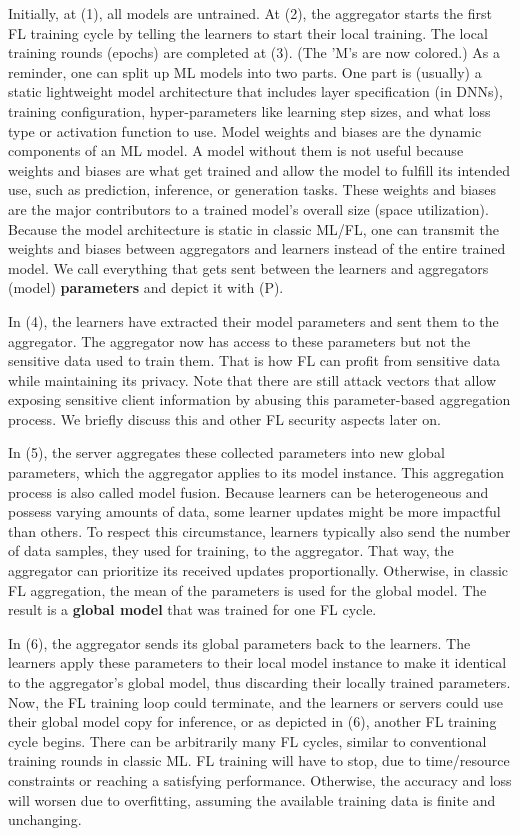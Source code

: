 Initially, at (1), all models are untrained.
At (2), the aggregator starts the first FL training cycle by telling the learners
to start their local training.
The local training rounds (epochs) are completed at (3).
(The 'M's are now colored.)
As a reminder, one can split up ML models into two parts.
One part is (usually) a static lightweight model architecture
that includes layer specification (in DNNs), training configuration,
hyper-parameters like learning step sizes, and what loss type or
activation function to use.
Model weights and biases are the dynamic components of an ML model.
A model without them is not useful because weights and biases
are what get trained and allow the model to fulfill its intended use,
such as prediction, inference, or generation tasks.
These weights and biases are the major contributors to
a trained model's overall size (space utilization).
Because the model architecture is static in classic ML/FL,
one can transmit the weights and biases between aggregators and learners
instead of the entire trained model.
We call everything that gets sent between the learners and aggregators
(model) \textbf{parameters} and depict it with (P).

In (4), the learners have extracted their model parameters and sent them to the aggregator.
The aggregator now has access to these parameters but not
the sensitive data used to train them.
That is how FL can profit from sensitive data while maintaining its privacy.
Note that there are still attack vectors that allow exposing sensitive client information
by abusing this parameter-based aggregation process.
We briefly discuss this and other FL security aspects later on.

In (5), the server aggregates these collected parameters into
new global parameters, which the aggregator applies to its model instance.
This aggregation process is also called model fusion.
Because learners can be heterogeneous and possess varying amounts of data,
some learner updates might be more impactful than others.
To respect this circumstance, learners typically also send the number
of data samples, they used for training, to the aggregator.
That way, the aggregator can prioritize its received updates proportionally.
Otherwise, in classic FL aggregation, the mean of the parameters is used for the global model.
The result is a \textbf{global model} that was trained for one FL cycle.

In (6), the aggregator sends its global parameters back to the learners.
The learners apply these parameters to their local model instance
to make it identical to the aggregator's global model,
thus discarding their locally trained parameters.
Now, the FL training loop could terminate, and the learners or servers
could use their global model copy for inference, or
as depicted in (6), another FL training cycle begins.
There can be arbitrarily many FL cycles, similar to conventional training rounds
in classic ML. FL training will have to stop,
due to time/resource constraints or reaching a satisfying performance.
Otherwise, the accuracy and loss will worsen due to overfitting,
assuming the available training data is finite and unchanging.
